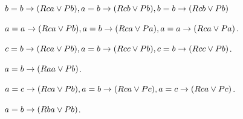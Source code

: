 \documentclass[PHIL101-Textbook.tex]{subfiles}
\begin{document}
\pagebreak

\noindent
{}
\begin{earg}
\item $b = b \rightarrow (Rca \vee Pb), a = b \rightarrow (Rcb \vee Pb), b = b \rightarrow (Rcb \vee Pb)$
\item $a = a \rightarrow (Rca \vee Pb), a = b \rightarrow (Rca \vee Pa), a = a \rightarrow (Rca \vee Pa)$.
\item $c = b \rightarrow (Rca \vee Pb), a = b \rightarrow (Rcc \vee Pb), c = b \rightarrow (Rcc \vee Pb)$.
\item $a = b \rightarrow (Raa \vee Pb)$.
\item $a = c \rightarrow (Rca \vee Pb), a = b \rightarrow (Rca \vee Pc), a = c \rightarrow (Rca \vee Pc)$.
  \item $a = b \rightarrow (Rba \vee Pb)$. 
\end{earg}
\end{document}
